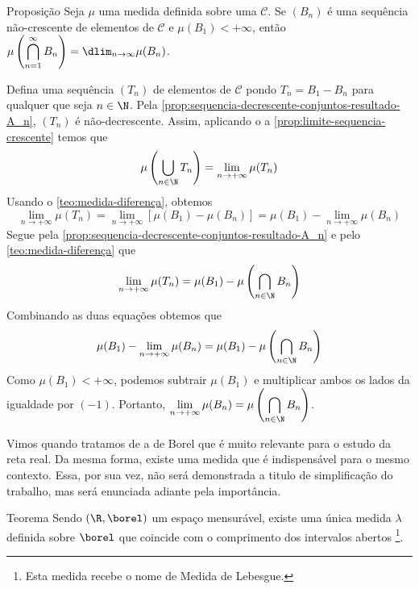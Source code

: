 \begin{env}{Proposição}
Seja $\mu$ uma medida definida sobre uma \sigal $\mathcal{C}$.
Se $(B_n)$ é uma sequência não-crescente de elementos de $\mathcal{C}$ e $\mu(B_1) < +\infty$, então 
$\mu\left(\displaystyle \bigcap_{n = 1}^\infty B_n\right) = \dlim_{n \to \infty} \mu(B_n)$.
\end{env} 
\begin{prova}
    Defina uma sequência $(T_n)$ de elementos de $\mathcal{C}$ pondo $T_n = B_1 - B_n$ para qualquer que seja $n \in \N$.
    Pela \ref{prop:sequencia-decrescente-conjuntos-resultado-A_n}, $(T_n)$ é não-decrescente.
    Assim, aplicando o a \ref{prop:limite-sequencia-crescente} temos que 
    $$
    \mu\left(\bigcup_{n \in \N} T_n\right) = \lim_{n \to +\infty} \mu(T_n)
    $$
    Usando o \ref{teo:medida-diferença}, obtemos
    $$
    \lim_{n \to +\infty} \mu(T_n) = \lim_{n \to +\infty} [\mu(B_1) - \mu(B_n)] = \mu(B_1) - \lim_{n \to +\infty} \mu(B_n)
    $$
    Segue pela \ref{prop:sequencia-decrescente-conjuntos-resultado-A_n} e pelo \ref{teo:medida-diferença} que 
    $$
    \lim_{n \to +\infty} \mu(T_n) = \mu(B_1) - \mu\left(\bigcap_{n \in \N} B_n\right)
    $$
    Combinando as duas equações obtemos que
    \begin{align*}
        \mu(B_1) - \lim_{n \to +\infty} \mu(B_n) = \mu(B_1) - \mu\left(\bigcap_{n \in \N} B_n\right)
    \end{align*}
    Como $\mu(B_1) < +\infty$, podemos subtrair $\mu(B_1)$ e multiplicar ambos os lados da igualdade por $(-1)$.
    Portanto, $\displaystyle \lim_{n \to +\infty} \mu(B_n) = \mu\left(\bigcap_{n \in \N} B_n\right)$.
\end{prova}

Vimos quando tratamos de \sigals a \sigal de Borel que é muito relevante para o estudo da reta real.
Da mesma forma, existe uma medida que é indispensável para o mesmo contexto.
Essa, por sua vez, não será demonstrada a titulo de simplificação do trabalho, mas será enunciada adiante pela importância. 
\begin{env}{Teorema}
	\label{teo: medida de lebesgue}
	Sendo $(\R, \borel)$ um espaço mensurável, existe uma única medida $\lambda$ definida sobre $\borel$ que coincide com o comprimento dos intervalos abertos \cite[p.20, tradução nossa, adaptação nossa]{bartle}
	\footnote{Esta medida recebe o nome de Medida de Lebesgue.}.
\end{env}

